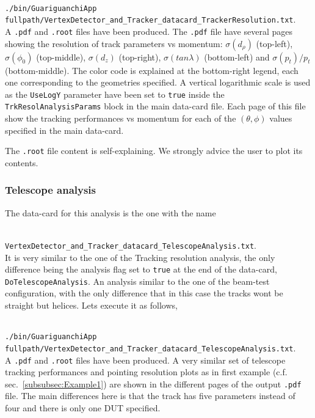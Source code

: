 ~\\
{\small {\tt ./bin/GuariguanchiApp  fullpath/VertexDetector\_and\_Tracker\_datacard\_TrackerResolution.txt}}.
~\\

\noindent
A {\tt .pdf} and {\tt .root} files have been produced. The {\tt .pdf} file have several pages showing the resolution of track parameters vs momentum: $\sigma(d_{\rho})$ (top-left),
$\sigma(\phi_0)$ (top-middle), $\sigma(d_z)$ (top-right), $\sigma(tan\lambda)$ (bottom-left) and $\sigma(p_{t})/p_{t}$ (bottom-middle). The color code is explained at the bottom-right 
legend, each one corresponding to the geometries specified. A vertical logarithmic scale is used as the {\tt UseLogY} parameter have been set to {\tt true} inside the {\tt TrkResolAnalysisParams} 
block in the main data-card file. Each page of this file show the tracking performances vs momentum for each of the $(\theta,\phi)$ values specified in the main data-card.

The {\tt .root} file content is self-explaining. We strongly advice the user to plot its contents.

\subsubsection*{Telescope analysis}

The data-card for this analysis is the one with the name

~\\
{\small {\tt VertexDetector\_and\_Tracker\_datacard\_TelescopeAnalysis.txt}}.
~\\

\noindent
It is very similar to the one of the Tracking resolution analysis, the only difference being the analysis flag set to {\tt true} at the end of the data-card, {\tt DoTelescopeAnalysis}. 
An analysis similar to the one of the beam-test configuration, with the only difference that in this case the tracks wont be straight but helices. Lets execute it as follows,

~\\
{\small {\tt ./bin/GuariguanchiApp fullpath/VertexDetector\_and\_Tracker\_datacard\_TelescopeAnalysis.txt}}.
~\\

A {\tt .pdf} and {\tt .root} files have been produced. A very similar set of telescope tracking performances and pointing resolution plots as in first example (c.f. sec.~\ref{subsubsec:Example1}) 
are shown in the different pages of the output {\tt .pdf} file. The main differences here is that the track has five parameters instead of four and there is only one DUT specified. 

